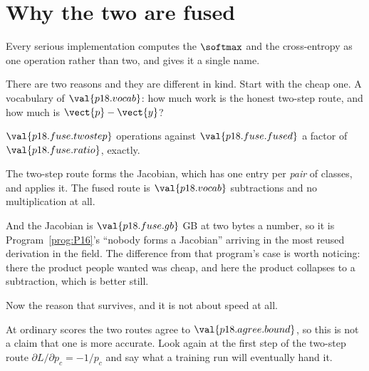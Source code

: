 \section{Why the two are fused}
\label{sec:P18-fusion}

\begin{fr}
Every serious implementation computes the $\softmax$ and the cross-entropy as
one operation rather than two, and gives it a single name.

There are two reasons and they are different in kind. Start with the cheap
one. A vocabulary of $\val{p18.vocab}$: how much work is the honest two-step
route, and how much is $\vect{p} - \vect{y}$?
\dotline
\nextframe
\end{fr}

\begin{fr}
\begin{ansblock}
$\val{p18.fuse.twostep}$ operations against $\val{p18.fuse.fused}$
\dash{} a factor of $\val{p18.fuse.ratio}$, exactly.
\end{ansblock}

The two-step route forms the Jacobian, which has one entry per \emph{pair} of
classes, and applies it. The fused route is $\val{p18.vocab}$ subtractions
and no multiplication at all.

And the Jacobian is $\val{p18.fuse.gb}$ GB at two bytes a number, so it is
Program~\ref{prog:P16}'s \enquote{nobody forms a Jacobian} arriving in the
most reused derivation in the field. The difference from that program's case
is worth noticing: there the product people wanted was cheap, and here the
product collapses to a subtraction, which is better still.

\end{fr}

\begin{fr}
Now the reason that survives, and it is not about speed at all.

At ordinary scores the two routes agree to $\val{p18.agree.bound}$, so this
is not a claim that one is more accurate. Look again at the first step of the
two-step route \dash{} $\partial L/\partial p_c = -1/p_c$ \dash{} and say
what a training run will eventually hand it.
\dotline
\nextframe
\end{fr}

